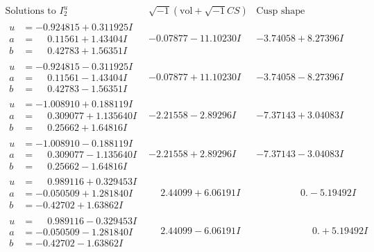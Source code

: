 \documentclass[1p]{elsarticle_modified}
\theoremstyle{definition}
\newcommand{\I}{\sqrt{-1}}
\begin{document}
$$\begin{array}{c|c|c}  
\text{Solutions to }I^u_{2}& \I (\text{vol} + \sqrt{-1}CS) & \text{Cusp shape}\\
 \hline 
\begin{aligned}
u &= -0.924815 + 0.311925 I \\
a &= \phantom{-}0.11561 + 1.43404 I \\
b &= \phantom{-}0.42783 + 1.56351 I\end{aligned}
 & -0.07877 - 11.10230 I & -3.74058 + 8.27396 I \\ \hline\begin{aligned}
u &= -0.924815 - 0.311925 I \\
a &= \phantom{-}0.11561 - 1.43404 I \\
b &= \phantom{-}0.42783 - 1.56351 I\end{aligned}
 & -0.07877 + 11.10230 I & -3.74058 - 8.27396 I \\ \hline\begin{aligned}
u &= -1.008910 + 0.188119 I \\
a &= \phantom{-}0.309077 + 1.135640 I \\
b &= \phantom{-}0.25662 + 1.64816 I\end{aligned}
 & -2.21558 - 2.89296 I & -7.37143 + 3.04083 I \\ \hline\begin{aligned}
u &= -1.008910 - 0.188119 I \\
a &= \phantom{-}0.309077 - 1.135640 I \\
b &= \phantom{-}0.25662 - 1.64816 I\end{aligned}
 & -2.21558 + 2.89296 I & -7.37143 - 3.04083 I \\ \hline\begin{aligned}
u &= \phantom{-}0.989116 + 0.329453 I \\
a &= -0.050509 + 1.281840 I \\
b &= -0.42702 + 1.63862 I\end{aligned}
 & \phantom{-}2.44099 + 6.06191 I & \phantom{-0.000000 } 0. - 5.19492 I \\ \hline\begin{aligned}
u &= \phantom{-}0.989116 - 0.329453 I \\
a &= -0.050509 - 1.281840 I \\
b &= -0.42702 - 1.63862 I\end{aligned}
 & \phantom{-}2.44099 - 6.06191 I & \phantom{-0.000000 -}0. + 5.19492 I \\ \hline\begin{aligned}

\end{aligned}
\end{array}$$
\end{document}
